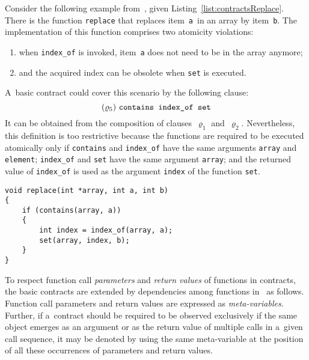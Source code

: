 \begin{example}
    Consider the following example from~\cite{contracts2017, contracts2015}, given Listing~\ref{list:contractsReplace}. There is the function \texttt{replace} that replaces item~\texttt{a}~in an array by item~\texttt{b}. The implementation of this function comprises two atomicity violations:
    \begin{enumerate}
        \item when \texttt{index\_of} is invoked, item~\texttt{a} does not need to be in the array anymore;

        \item and the acquired index can be obsolete when \texttt{set} is executed.
    \end{enumerate}
    A~basic contract could cover this scenario by the following clause:
    $$ 
        (\varrho_5)\ \text{\texttt{contains index\_of set}}
    $$
    It can be obtained from the composition of clauses~$ \varrho_1 $ and~$ \varrho_2 $. Nevertheless, this definition is too restrictive because the functions are required to be executed atomically only if \texttt{contains} and \texttt{index\_of} have the same arguments \texttt{array} and \texttt{element}; \texttt{index\_of} and \texttt{set} have the same argument \texttt{array}; and the returned value of \texttt{index\_of} is used as the argument \texttt{index} of the function \texttt{set}.
\end{example}

\begin{lstlisting}[style=c, label={list:contractsReplace}, float=hbt, caption={An example of an atomicity violation with \emph{data dependencies}~\cite{contracts2017, contracts2015}}]
void replace(int *array, int a, int b)
{
    if (contains(array, a))
    {
        int index = index_of(array, a);
        set(array, index, b);
    }
}
\end{lstlisting}

To respect function call \emph{parameters} and \emph{return values} of functions in contracts, the basic contracts are extended by dependencies among functions in~\cite{contracts2017, contracts2015} as follows. Function call parameters and return values are expressed as \emph{meta-variables}. Further, if a~contract should be required to be observed exclusively if the same object emerges as an argument or as the return value of multiple calls in a~given call sequence, it may be denoted by using the same meta-variable at the position of all these occurrences of parameters and return values.

